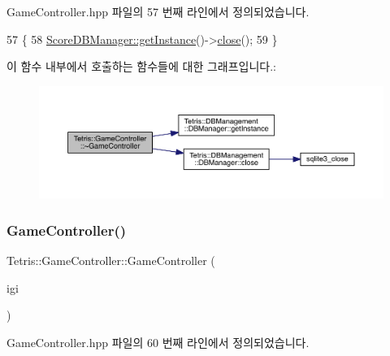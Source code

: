 Game\+Controller.\+hpp 파일의 57 번째 라인에서 정의되었습니다.


\begin{DoxyCode}
57                          \{
58             \hyperlink{class_tetris_1_1_d_b_management_1_1_d_b_manager_a9cb81505055490211a9b5c79c3c22c18}{ScoreDBManager::getInstance}()->\hyperlink{class_tetris_1_1_d_b_management_1_1_d_b_manager_a8390e6ddf3fa06e90fa5c2ab4997e5c1}{close}();
59         \}
\end{DoxyCode}
이 함수 내부에서 호출하는 함수들에 대한 그래프입니다.\+:
\nopagebreak
\begin{figure}[H]
\begin{center}
\leavevmode
\includegraphics[width=350pt]{db/dd2/class_tetris_1_1_game_controller_a8c9011047ce96d89e4d913feb9a88eed_cgraph}
\end{center}
\end{figure}
\mbox{\label{class_tetris_1_1_game_controller_a5dd9a021a0a87bed079bc1ad309e4039}} 
\subsubsection{\texorpdfstring{Game\+Controller()}{GameController()}\hspace{0.1cm}{\footnotesize\ttfamily [4/4]}}
{\footnotesize\ttfamily Tetris\+::\+Game\+Controller\+::\+Game\+Controller (\begin{DoxyParamCaption}\item[{\hyperlink{class_tetris_1_1_init_game_info}{Init\+Game\+Info} $\ast$}]{igi }\end{DoxyParamCaption})\hspace{0.3cm}{\ttfamily [inline]}}



Game\+Controller.\+hpp 파일의 60 번째 라인에서 정의되었습니다.


